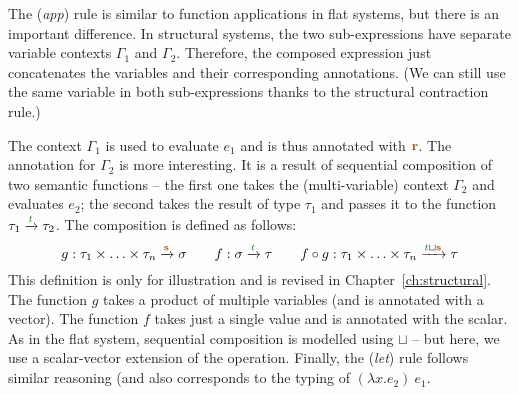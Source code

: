 The (\emph{app}) rule is similar to function applications in flat systems, but there is an important
difference. In structural systems, the two sub-expressions have separate variable contexts
$\Gamma_1$ and $\Gamma_2$. Therefore, the composed expression just concatenates the variables
and their corresponding annotations. (We can still use the same variable in both sub-expressions
thanks to the structural contraction rule.) 

The context $\Gamma_1$ is used to evaluate $e_1$ and is thus annotated with $\aclrd{\mathbf{r}}$. 
The annotation for $\Gamma_2$ is more interesting. It is a result of sequential composition of two
semantic functions -- the first one takes the (multi-variable) context $\Gamma_2$ and evaluates 
$e_2$; the second takes the result of type $\tau_1$ and passes it to the function $\tau_1 \xrightarrow{\cclrd{t}} \tau_2$.
The composition is defined as follows:
%
\begin{equation*}
g : \tau_1 \times \ldots \times \tau_n \xrightarrow{\aclrd{\mathbf{s}}} \sigma
\qquad
f : \sigma \xrightarrow{\cclrd{t}} \tau
\qquad
f \circ g : \tau_1 \times \ldots \times \tau_n \xrightarrow{\cclrd{t} \sqcup \aclrd{\mathbf{s}}} \tau
\end{equation*}
%
This definition is only for illustration and is revised in Chapter~\ref{ch:structural}. The function
$g$ takes a product of multiple variables (and is annotated with a vector). The function $f$ takes
just a single value and is annotated with the scalar. As in the flat system, sequential composition
is modelled using $\sqcup$ -- but here, we use a scalar-vector extension of the operation. Finally,
the (\emph{let}) rule follows similar reasoning (and also corresponds to the typing of $(\lambda x.e_2)~e_1$.


